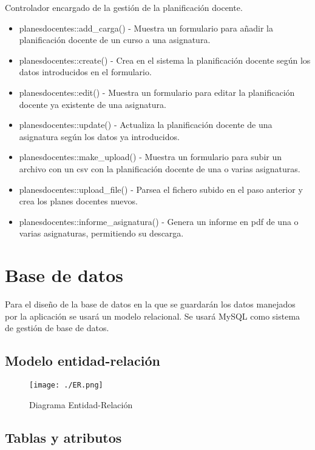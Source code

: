Controlador encargado de la gestión de la planificación docente.

\begin{itemize}
\item planesdocentes::add\_carga() - Muestra un formulario para añadir la planificación docente de un curso a una asignatura.
\item planesdocentes::create() - Crea en el sistema la planificación docente según los datos introducidos en el formulario.
\item planesdocentes::edit() - Muestra un formulario para editar la planificación docente ya existente de una asignatura.
\item planesdocentes::update() - Actualiza la planificación docente de una asignatura según los datos ya introducidos.
\item planesdocentes::make\_upload() - Muestra un formulario para subir un archivo con un csv con la planificación docente de una o varias asignaturas.
\item planesdocentes::upload\_file() - Parsea el fichero subido en el paso anterior y crea los planes docentes nuevos.
\item planesdocentes::informe\_asignatura() - Genera un informe en pdf de una o varias asignaturas, permitiendo su descarga.
\end{itemize}

\section{Base de datos}
Para el diseño de la base de datos en la que se guardarán los datos manejados por la aplicación se usará un modelo relacional. Se usará MySQL como sistema de gestión de base de datos. 
\subsection{Modelo entidad-relación}
\begin{figure}[H] 
  \label{diagrama-er} 
	\begin{center}
    \texttt{[image: ./ER.png]}
  \end{center}
\caption{Diagrama Entidad-Relación}
\end{figure}
\subsection{Tablas y atributos}

